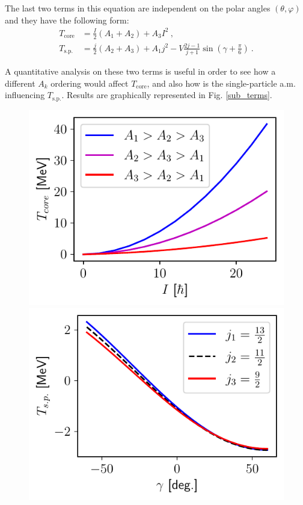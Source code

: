 \documentclass[myclassdoc,debug]{rjparticle}
\begin{document}
The last two terms in this equation are independent on the polar angles $(\theta,\varphi)$ and they have the following form:
\begin{align}
    T_\text{core}&=\frac{I}{2}(A_1+A_2)+A_3I^2\ , \label{core-sub-term} \\
    T_\text{s.p.}&=\frac{j}{2}(A_2+A_3)+A_1j^2-V\frac{2j-1}{j+1}\sin\left(\gamma+\frac{\pi}{6}\right)\ .
    \label{single-particle-sub-term}
\end{align}

A quantitative analysis on these two terms is useful in order to see how a different $A_k$ ordering would affect $T_\text{core}$, and also how is the single-particle a.m. influencing $T_\text{s.p.}$. Results are graphically represented in Fig. \ref{sub_terms}.
\begin{figure}
\centering
\begin{minipage}{.5\textwidth}
  \centering
  \includegraphics[scale=0.7]{figs/T_Core.pdf}
\end{minipage}%
\begin{minipage}{.5\textwidth}
  \centering
 \includegraphics[scale=0.7]{figs/T_SingleParticle.pdf}

\end{minipage}
\end{figure}
\end{document}
